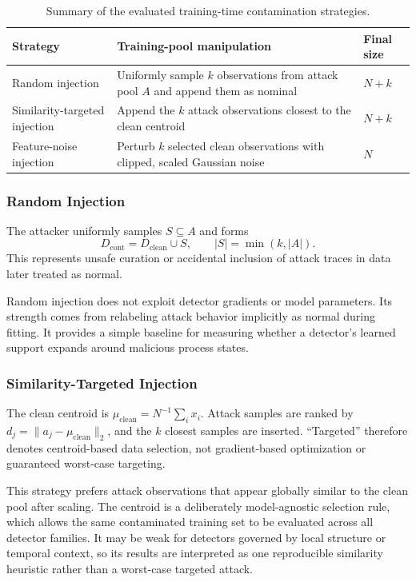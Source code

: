 \documentclass[10pt,conference]{IEEEtran}
\begin{document}
\begin{table}[t]
\caption{Summary of the evaluated training-time contamination strategies.}
\label{tab:attack_summary}
\centering
\scriptsize
\setlength{\tabcolsep}{3pt}
\renewcommand{\arraystretch}{1.08}
\begin{tabular}{|p{1.35cm}|p{3.15cm}|p{1.2cm}|}
\hline
\textbf{Strategy} & \textbf{Training-pool manipulation} & \textbf{Final size} \\
\hline
Random injection & Uniformly sample $k$ observations from attack pool $A$ and append them as nominal & $N+k$ \\
\hline
Similarity-targeted injection & Append the $k$ attack observations closest to the clean centroid & $N+k$ \\
\hline
Feature-noise injection & Perturb $k$ selected clean observations with clipped, scaled Gaussian noise & $N$ \\
\hline
\end{tabular}
\end{table}

\subsubsection{Random Injection}
The attacker uniformly samples $S\subseteq A$ and forms
\begin{equation}
D_{\mathrm{cont}}=D_{\mathrm{clean}}\cup S, \qquad |S|=\min(k,|A|).
\end{equation}
This represents unsafe curation or accidental inclusion of attack traces in data later treated as normal.

Random injection does not exploit detector gradients or model parameters. Its strength comes from relabeling attack behavior implicitly as normal during fitting. It provides a simple baseline for measuring whether a detector's learned support expands around malicious process states.

\subsubsection{Similarity-Targeted Injection}
The clean centroid is $\mu_{\mathrm{clean}}=N^{-1}\sum_i x_i$. Attack samples are ranked by $d_j=\lVert a_j-\mu_{\mathrm{clean}}\rVert_2$, and the $k$ closest samples are inserted. ``Targeted'' therefore denotes centroid-based data selection, not gradient-based optimization or guaranteed worst-case targeting.

This strategy prefers attack observations that appear globally similar to the clean pool after scaling. The centroid is a deliberately model-agnostic selection rule, which allows the same contaminated training set to be evaluated across all detector families. It may be weak for detectors governed by local structure or temporal context, so its results are interpreted as one reproducible similarity heuristic rather than a worst-case targeted attack.
\end{document}
